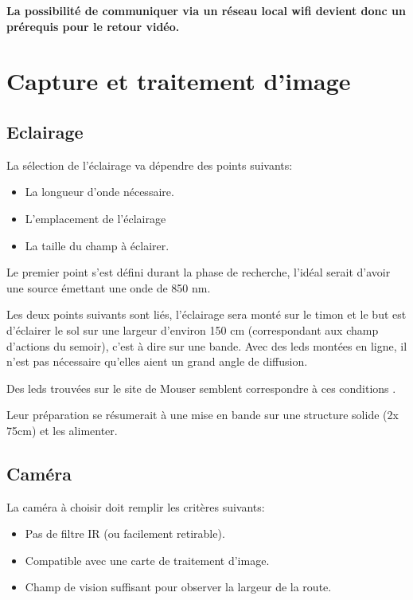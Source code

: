 \textbf{La possibilité de communiquer via un réseau local \Gls{wifi} devient donc un prérequis pour le retour vidéo.}
\newpage
\section{Capture et traitement d'image}
\subsection{Eclairage}
La sélection de l'éclairage va dépendre des points suivants:
\begin{itemize}
    \item La longueur d'onde nécessaire.
    \item L'emplacement de l'éclairage
    \item La taille du champ à éclairer.
\end{itemize}
Le premier point s'est défini durant la phase de recherche, l'idéal serait d'avoir une source émettant une onde de 850 \si{\nano\metre}.

Les deux points suivants sont liés, l'éclairage sera monté sur le timon et le but est d'éclairer le sol sur une largeur d'environ 150 \si{\centi\metre} (correspondant aux champ d'actions du semoir),
c'est à dire sur une bande. Avec des leds montées en ligne, il n'est pas nécessaire qu'elles aient un grand angle de diffusion.

Des leds trouvées sur le site de Mouser semblent correspondre à ces conditions \cite{ledIR}.

Leur préparation se résumerait à une mise en bande sur une structure solide (2x 75\si{\centi\metre}) et les alimenter.


\subsection{Caméra}
La caméra à choisir doit remplir les critères suivants:
\begin{itemize}
    \item Pas de filtre IR (ou facilement retirable).
    \item Compatible avec une carte de traitement d'image.
    \item Champ de vision suffisant pour observer la largeur de la route.
\end{itemize}

